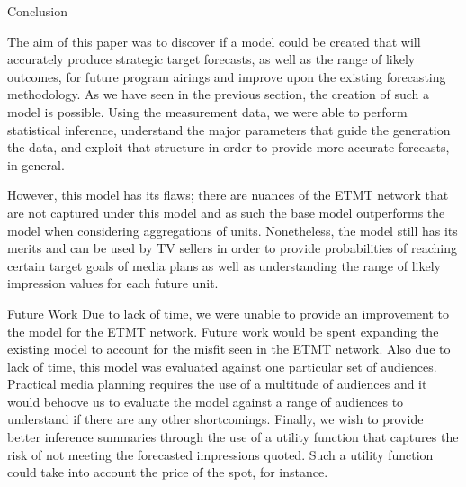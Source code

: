 \begin{chapter}{Conclusion}

The aim of this paper was to discover if a model could be created that will accurately
produce strategic target forecasts, as well as the range of likely outcomes, for future program airings
and improve upon the existing forecasting methodology.
As we have seen in the previous section, the creation of such a model is possible.
Using the measurement data, we were able to perform statistical inference, understand
the major parameters that guide the generation the data, and exploit that structure
in order to provide more accurate forecasts, in general.

However, this model has its flaws; there are nuances of the ETMT network that are not
captured under this model and as such the base model outperforms the model when considering
aggregations of units. Nonetheless, the model still has its merits and can be used by
TV sellers in order to provide probabilities of reaching certain target goals of media plans as well
as understanding the range of likely impression values for each future unit.

\begin{section}{Future Work}
  Due to lack of time, we were unable to provide an improvement to the model for the ETMT network.
  Future work would be spent expanding the existing model to account for the misfit seen in the ETMT network.
  Also due to lack of time, this model was evaluated against one particular set of audiences. Practical
  media planning requires the use of a multitude of audiences and it would behoove us to evaluate
  the model against a range of audiences to understand if there are any other shortcomings. Finally,
  we wish to provide better inference summaries through the use of a utility function that captures
  the risk of not meeting the forecasted impressions quoted. Such a utility function could take into account the
  price of the spot, for instance.
\end{section}

\end{chapter}